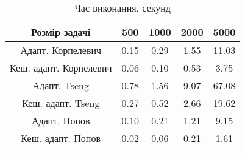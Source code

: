 \begin{table}[H]
	\centering
	\begin{tabular}{|c||c|c|c|c|}\hline
		Розмір задачі & 500 & 1000 & 2000 & 5000 \\ \hline \hline
		Адапт. Корпелевич & 0.15 & 0.29 & 1.55 & 11.03 \\ \hline
		Кеш. адапт. Корпелевич & 0.06 & 0.10 & 0.53 & 3.75 \\ \hline
		Адапт. Tseng & 0.78 & 1.56 & 9.07 & 67.08 \\ \hline
		Кеш. адапт. Tseng & 0.27 & 0.52 & 2.66 & 19.62 \\ \hline
		Адапт. Попов & 0.10 & 0.21 & 1.21 & 9.15 \\ \hline
		Кеш. адапт. Попов & 0.02 & 0.06 & 0.21 & 1.61 \\ \hline
	\end{tabular}
	\caption{Час виконання, секунд}
\end{table}
